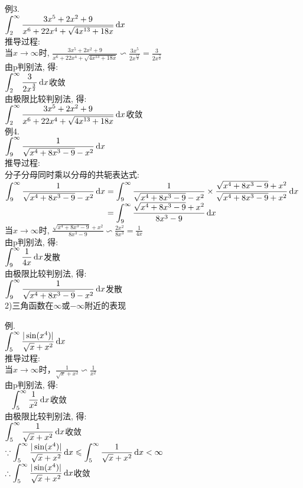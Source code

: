 例3.\\
\phantom{例}$\displaystyle\int_2^\infty\frac{3x^5+2x^2+9}{x^6+22x^4+\sqrt{4x^{13}+18x}}\mathop{}\!\mathrm{d} x$\\
推导过程:\\
当$x\to\infty$时, $\displaystyle\frac{3x^5+2x^2+9}{x^6+22x^4+\sqrt{4x^{13}+18x}}\backsim\frac{3x^5}{2x^{\frac{13}{2}}}=\frac{3}{2x^\frac{3}{2}}$\\
由p判别法, 得:\\
$\displaystyle\int_2^\infty\frac{3}{2x^\frac{3}{2}}\mathop{}\!\mathrm{d} x$收敛\\
由极限比较判别法, 得:\\
$\displaystyle\int_2^\infty\frac{3x^5+2x^2+9}{x^6+22x^4+\sqrt{4x^{13}+18x}}\mathop{}\!\mathrm{d} x$收敛\\[1ex]

例4.\\
\phantom{例}$\displaystyle\int_9^\infty\frac{1}{\sqrt{x^4+8x^3-9}-x^2}\mathop{}\!\mathrm{d} x$\\
推导过程:\\
分子分母同时乘以分母的共轭表达式:\\
$\displaystyle\int_9^\infty\frac{1}{\sqrt{x^4+8x^3-9}-x^2}\mathop{}\!\mathrm{d} x=\displaystyle\int_9^\infty\frac{1}{\sqrt{x^4+8x^3-9}-x^2}\times\frac{\sqrt{x^4+8x^3-9}+x^2}{\sqrt{x^4+8x^3-9}+x^2}\mathop{}\!\mathrm{d} x$\\
$\displaystyle\phantom{\int_9^\infty\frac{1}{\sqrt{x^4+8x^3-9}-x^2}\dif x}=\int_9^\infty\frac{\sqrt{x^4+8x^3-9}+x^2}{8x^3-9}\dif x$\\
当$x\to\infty$时, $\displaystyle\frac{\sqrt{x^4+8x^3-9}+x^2}{8x^3-9}\backsim\frac{2x^2}{8x^3}=\frac{1}{4x}$\\
由p判别法, 得:\\
$\displaystyle\int_9^\infty\frac{1}{4x}\mathop{}\!\mathrm{d} x$发散\\
由极限比较判别法, 得:\\
$\displaystyle\int_9^\infty\frac{1}{\sqrt{x^4+8x^3-9}-x^2}\mathop{}\!\mathrm{d} x$发散\\[2ex]

2)三角函数在$\infty$或$-\infty$附近的表现
\begin{center}
\qquad
{}
\end{center}

例.\\
\phantom{例}$\displaystyle\int_5^{\infty}\frac{|\sin(x^4)|}{\sqrt{x}+x^2}\mathop{}\!\mathrm{d} x$\\
推导过程:\\
当$x\to\infty$时，$\displaystyle\frac{1}{\sqrt{x}+x^2}\backsim\frac{1}{x^2}$\\
由p判别法, 得:\\
$\displaystyle\phantom{\because}\int_5^{\infty}\frac{1}{x^2}\mathop{}\!\mathrm{d} x$收敛\\
由极限比较判别法, 得:\\
$\displaystyle\int_5^\infty\frac{1}{\sqrt{x}+x^2}\mathop{}\!\mathrm{d} x$收敛\\
$\displaystyle\because\int_5^{\infty}\frac{|\sin(x^4)|}{\sqrt{x}+x^2}\mathop{}\!\mathrm{d} x\leqslant\int_5^{\infty}\frac{1}{\sqrt{x}+x^2}\mathop{}\!\mathrm{d} x<\infty$\\
$\displaystyle\therefore\int_5^{\infty}\frac{|\sin(x^4)|}{\sqrt{x}+x^2}\mathop{}\!\mathrm{d} x$收敛\\[2ex]

